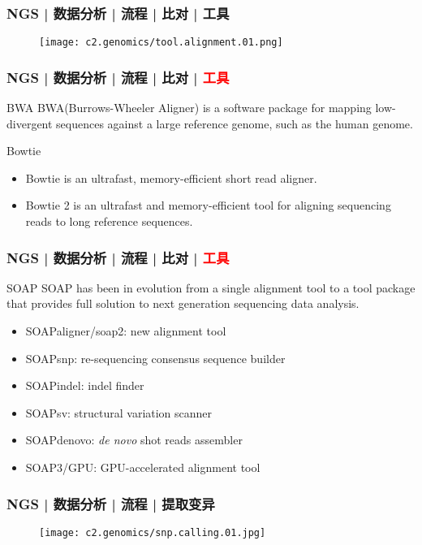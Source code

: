 \begin{frame}
  \frametitle{NGS | 数据分析 | 流程 | 比对 | 工具}
  \begin{figure}
    \centering
    \texttt{[image: c2.genomics/tool.alignment.01.png]}
  \end{figure}
\end{frame}

\begin{frame}
  \frametitle{NGS | 数据分析 | 流程 | 比对 | \textcolor{red}{工具}}
  \begin{block}{BWA}
    BWA(Burrows-Wheeler Aligner) is a software package for mapping low-divergent sequences against a large reference genome, such as the human genome.
  \end{block}
  \pause
  \begin{block}{Bowtie}
    \begin{itemize}
      \item Bowtie is an ultrafast, memory-efficient short read aligner.
      \item Bowtie 2 is an ultrafast and memory-efficient tool for aligning sequencing reads to long reference sequences.
    \end{itemize}
  \end{block}
\end{frame}

\begin{frame}
  \frametitle{NGS | 数据分析 | 流程 | 比对 | \textcolor{red}{工具}}
  \begin{block}{SOAP}
    SOAP has been in evolution from a single alignment tool to a tool package that provides full solution to next generation sequencing data analysis.
    \begin{itemize}
      \item SOAPaligner/soap2: new alignment tool
      \item SOAPsnp: re-sequencing consensus sequence builder
      \item SOAPindel: indel finder
      \item SOAPsv: structural variation scanner
      \item SOAPdenovo: \textit{de novo} shot reads assembler
      \item SOAP3/GPU: GPU-accelerated alignment tool
    \end{itemize}
  \end{block}
\end{frame}

\begin{frame}
  \frametitle{NGS | 数据分析 | 流程 | 提取变异}
  \begin{figure}
    \centering
    \texttt{[image: c2.genomics/snp.calling.01.jpg]}
  \end{figure}
\end{frame}

